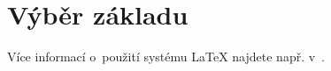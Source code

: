 \documentclass[thesis=B,czech]{FITthesis}[2011/06/14]
\begin{document}
\section{Výběr základu}
% 
% 
% 
% 
% 
% 
% 
% 
 Více informací o~použití systému \LaTeX{} najdete např. v~\cite{wikilatex}.
 
\end{document}

